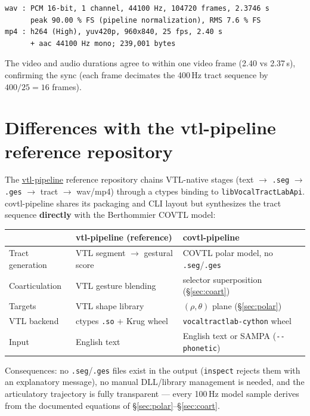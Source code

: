 \documentclass[11pt,a4paper]{article}
\begin{document}
\begin{lstlisting}[style=verbatim]
wav : PCM 16-bit, 1 channel, 44100 Hz, 104720 frames, 2.3746 s
      peak 90.00 % FS (pipeline normalization), RMS 7.6 % FS
mp4 : h264 (High), yuv420p, 960x840, 25 fps, 2.40 s
      + aac 44100 Hz mono; 239,001 bytes
\end{lstlisting}

The video and audio durations agree to within one video frame
(2.40 vs 2.37\,s), confirming the sync (each frame decimates the 400\,Hz
tract sequence by \(400/25 = 16\) frames).

\section{Differences with the vtl-pipeline reference repository}\label{sec:differences}

The \href{https://github.com/FBerthommier/vtl-pipeline}{vtl-pipeline}
reference repository chains VTL-native stages
(text \(\to\) \texttt{.seg} \(\to\) \texttt{.ges} \(\to\) tract
\(\to\) wav/mp4) through a ctypes binding to
\texttt{libVocalTractLabApi}. covtl-pipeline shares its packaging and CLI
layout but synthesizes the tract sequence \textbf{directly} with the
Berthommier COVTL model:

\begin{center}
\small
\begin{tabularx}{\textwidth}{lXX}
\toprule
 & \textbf{vtl-pipeline (reference)} & \textbf{covtl-pipeline} \\
\midrule
Tract generation & VTL segment \(\to\) gestural score & COVTL polar model, no \texttt{.seg}/\texttt{.ges} \\
Coarticulation & VTL gesture blending & selector superposition (\S\ref{sec:coart}) \\
Targets & VTL shape library & \((\rho,\theta)\) plane (\S\ref{sec:polar}) \\
VTL backend & ctypes \texttt{.so} + Krug wheel & \texttt{vocaltractlab-cython} wheel \\
Input & English text & English text or SAMPA (\texttt{-{}-phonetic}) \\
\bottomrule
\end{tabularx}
\end{center}

Consequences: no \texttt{.seg}/\texttt{.ges} files exist in the output
(\texttt{inspect} rejects them with an explanatory message), no manual
DLL/library management is needed, and the articulatory trajectory is
fully transparent --- every 100\,Hz model sample derives from the
documented equations of \S\ref{sec:polar}--\S\ref{sec:coart}.
\end{document}
